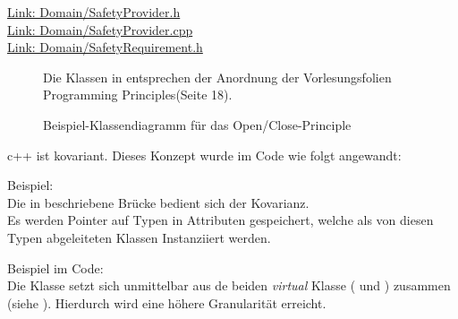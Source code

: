 \href{https://github.com/MobMonRob/ROSLabDrohne/blob/979c6057922852eac0af20a52e29393d41adfee5/Code/Domain/include/Domain/SafetyProvider.h}{Link: Domain/SafetyProvider.h}\\
\href{https://github.com/MobMonRob/ROSLabDrohne/blob/979c6057922852eac0af20a52e29393d41adfee5/Code/Domain/src/SafetyProvider.cpp}{Link: Domain/SafetyProvider.cpp}\\
\href{https://github.com/MobMonRob/ROSLabDrohne/blob/979c6057922852eac0af20a52e29393d41adfee5/Code/Domain/include/Domain/SafetyRequirement.h}{Link: Domain/SafetyRequirement.h}

\begin{figure}[ht!]
\vspace{0.25cm}
\begin{center}
\caption{Beispiel-Klassendiagramm für das Open/Close-Principle}
\label{fig:OC}
\end{center}

\vspace{0.25cm}
Die Klassen in  entsprechen der Anordnung der Vorlesungsfolien \glqq Programming Principles\grqq (Seite 18).
\end{figure}


c++ ist kovariant. Dieses Konzept wurde im Code wie folgt angewandt:

Beispiel:\\
Die in  beschriebene Brücke bedient sich der Kovarianz.\\
Es werden Pointer auf Typen in Attributen gespeichert, welche als von diesen Typen abgeleiteten Klassen Instanziiert werden.



Beispiel im Code:\\
Die Klasse  setzt sich unmittelbar aus de beiden \textit{virtual} Klasse ( und ) zusammen (siehe ). Hierdurch wird eine höhere Granularität erreicht.

